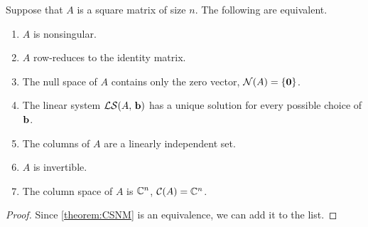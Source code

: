 \documentclass{ximera}
\begin{document}
\begin{theorem}

  Suppose that $A$ is a square matrix of size $n$.  The following are equivalent.
  \begin{enumerate}\item $A$ is nonsingular.
  \item $A$ row-reduces to the identity matrix.
  \item The null space of $A$ contains only the zero vector, $\mathcal{N}\!\left(A\right)=\left\{\mathbf{0}\right\}$.
  \item The linear system $\mathcal{LS}\!\left(A,\,\mathbf{b}\right)$ has a unique solution for every possible choice of $\mathbf{b}$.
  \item The columns of $A$ are a linearly independent set.
  \item $A$ is invertible.
  \item The column space of $A$ is $\mathbb{C}^{n}$, $\mathcal{C}\!\left(A\right)=\mathbb{C}^{n}$.
  \end{enumerate}

  \begin{proof}
    Since \ref{theorem:CSNM} is an equivalence, we can add it to the list.
  \end{proof}
\end{theorem}
\end{document}
